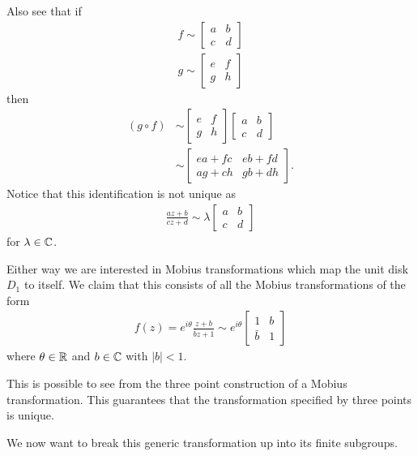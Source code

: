 \documentclass{unswmaths}
\begin{document}
Also see that if
\begin{align}
    f \sim \left[ \begin{array}{cc} a & b \\ c & d \end{array}\right] \\
    g \sim \left[ \begin{array}{cc} e & f \\ g & h \end{array}\right] 
\end{align}
then
\begin{align}
    (g \circ f) &\sim \left[ \begin{array}{cc} e & f \\ g & h \end{array}\right] \left[ \begin{array}{cc} a & b \\ c & d \end{array} \right] \\
    &\sim \left[ \begin{array}{cc} ea + fc & eb + fd \\ ag + ch & gb + dh\end{array}\right].
\end{align}
Notice that this identification is not unique as
\begin{align}
    \frac{az + b}{cz+d} \sim \lambda\left[ \begin{array}{cc} a & b \\ c & d \end{array}\right]
\end{align}
for $ \lambda \in \mathbb{C} $.

Either way we are interested in Mobius transformations which map the unit disk $ D_1 $ to itself. We claim that this consists of all the Mobius transformations of the form
\begin{align}
	f(z) = e^{i\theta} \frac{z+b}{\bar{b} z + 1 } \sim e^{i\theta} \left[ \begin{array}{cc} 1 & b \\ \bar{b} & 1\end{array} \right]
\end{align}
where $ \theta \in \mathbb{R} $ and $ b \in \mathbb{C} $ with $ |b| < 1 $. 

This is possible to see from the three point construction of a Mobius transformation. This guarantees that the transformation specified by three points is unique. 

We now want to break this generic transformation up into its finite subgroups.
\end{document}
